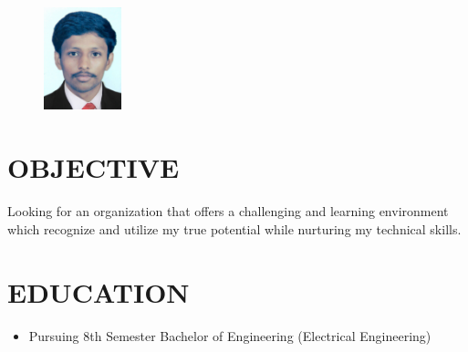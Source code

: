 \documentclass{res}
\begin{document}
 


				             

\address{\bf  ADDRESS\\B/8 Ohm Housing Society,\\Near Gokul Party Plot\\Gotri, Vadodara\\Gujarat-390021}
\address{\bf CONTACT \\ Mo. : +91 9924510968 \\  E-mail:nishitp18996@gmail.com }
                                                         
\begin{resume}
\begin{figure}[h]
\centering
\includegraphics[width=0.2\textwidth]{nishit}
\end{figure}

\section{OBJECTIVE}          
Looking for an organization that offers a challenging and learning environment which recognize and utilize my true potential while nurturing my technical skills.

\section{EDUCATION}  
\begin{itemize}
\item Pursuing 8th Semester Bachelor of Engineering (Electrical Engineering)
\end{itemize}    
    

\end{resume}
\end{document}
